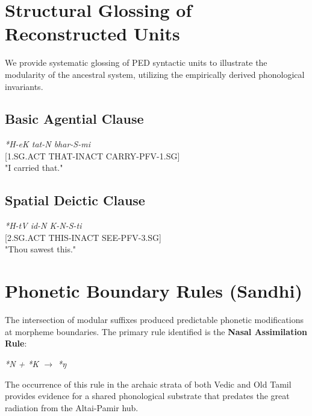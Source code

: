 \section{Structural Glossing of Reconstructed Units}
We provide systematic glossing of PED syntactic units to illustrate the modularity of the ancestral system, utilizing the empirically derived phonological invariants.

\subsection{Basic Agential Clause}
\begin{center}
\textit{*H-eK tat-N bhar-S-mi} \\
\small [1.SG.ACT THAT-INACT CARRY-PFV-1.SG] \\
\normalsize "I carried that."
\end{center}

\subsection{Spatial Deictic Clause}
\begin{center}
\textit{*H-tV id-N K-N-S-ti} \\
\small [2.SG.ACT THIS-INACT SEE-PFV-3.SG] \\
\normalsize "Thou sawest this."
\end{center}

\section{Phonetic Boundary Rules (Sandhi)}
The intersection of modular suffixes produced predictable phonetic modifications at morpheme boundaries. The primary rule identified is the \textbf{Nasal Assimilation Rule}:
\begin{center}
\textit{*N + *K $\rightarrow$ *ŋ}
\end{center}
The occurrence of this rule in the archaic strata of both Vedic and Old Tamil provides evidence for a shared phonological substrate that predates the great radiation from the Altai-Pamir hub.

